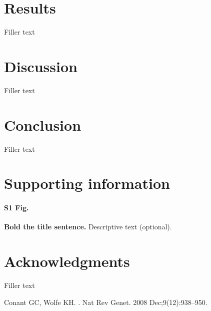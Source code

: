 \documentclass[10pt,letterpaper]{article}
\begin{document}
\section*{Results}
Filler text

\section*{Discussion}
Filler text

\section*{Conclusion}
Filler text

\section*{Supporting information}

\paragraph*{S1 Fig.}
\label{S1_Fig}
{\bf Bold the title sentence.} Descriptive text (optional).

\section*{Acknowledgments}
Filler text

\nolinenumbers

%
%
%
\begin{thebibliography}{10}

Conant GC, Wolfe KH.
.
\newblock Nat Rev Genet. 2008 Dec;9(12):938--950.

\end{thebibliography}
\end{document}

